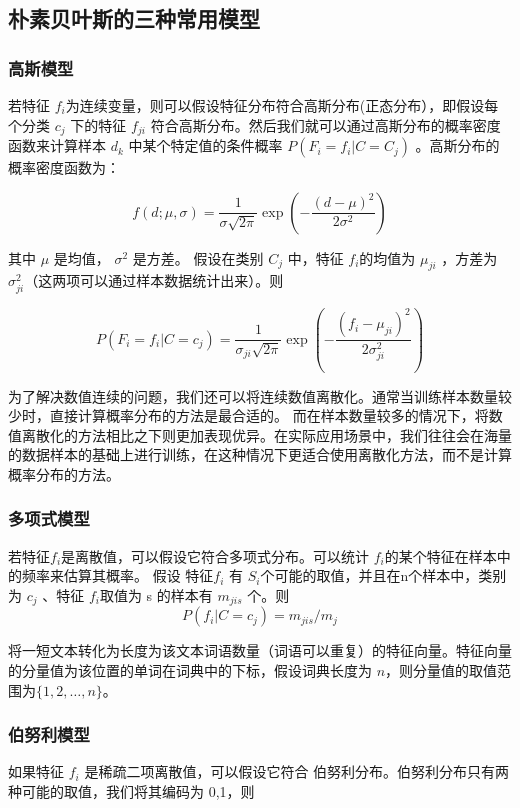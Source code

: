 \documentclass[UTF8,zihao=-4]{ctexart}
\begin{document}
	
\subsection{朴素贝叶斯的三种常用模型}
\subsubsection{高斯模型}
	若特征 $f_i $为连续变量，则可以假设特征分布符合高斯分布(正态分布），即假设每个分类 $c_j$ 下的特征 $f_{ji}$ 符合高斯分布。然后我们就可以通过高斯分布的概率密度函数来计算样本 $d_k$ 中某个特定值的条件概率 $P(F_i=f_i|C=C_j)$ 。高斯分布的概率密度函数为： 
	
	\begin{equation}
	f(d ; \mu, \sigma)=\frac{1}{\sigma \sqrt{2 \pi}} \exp \left(-\frac{(d-\mu)^{2}}{2 \sigma^{2}}\right)
	\end{equation}
	
	其中 $\mu$ 是均值， $\sigma^2$ 是方差。 假设在类别 $C_j$ 中，特征 $f_i$的均值为 $\mu_{ji}$ ，方差为 $\sigma_{ji}^2$（这两项可以通过样本数据统计出来）。则 
	
	\begin{equation}
	P\left(F_i=f_{i} | C=c_{j}\right)=\frac{1}{\sigma_{ji} \sqrt{2 \pi}} \exp \left(-\frac{\left(f_{i}-\mu_{ji}\right)^{2}}{2 \sigma_{ji}^{2}}\right)
	\end{equation}
	
	为了解决数值连续的问题，我们还可以将连续数值离散化。通常当训练样本数量较少时，直接计算概率分布的方法是最合适的。 而在样本数量较多的情况下，将数值离散化的方法相比之下则更加表现优异。在实际应用场景中，我们往往会在海量的数据样本的基础上进行训练，在这种情况下更适合使用离散化方法，而不是计算概率分布的方法。
\subsubsection{多项式模型}
	若特征$f_i$是离散值，可以假设它符合多项式分布。可以统计 $f_i $的某个特征在样本中的频率来估算其概率。 假设 特征$ f_i$ 有 $S_i $个可能的取值，并且在n个样本中，类别为 $c_j$ 、特征 $f_i $取值为 s 的样本有 $m_{jis}$ 个。则
	\begin{equation}
		P(f_{i} | C=c_{j})=m_{j i s} / m_{j}
	\end{equation}
	
	将一短文本转化为长度为该文本词语数量（词语可以重复）的特征向量。特征向量的分量值为该位置的单词在词典中的下标，假设词典长度为 $n$，则分量值的取值范围为$\{1,2,\dots,n\}$。
	
	
\subsubsection{伯努利模型}
    如果特征 $f_i$ 是稀疏二项离散值，可以假设它符合 伯努利分布。伯努利分布只有两种可能的取值，我们将其编码为 {0,1}，则
\end{document}
